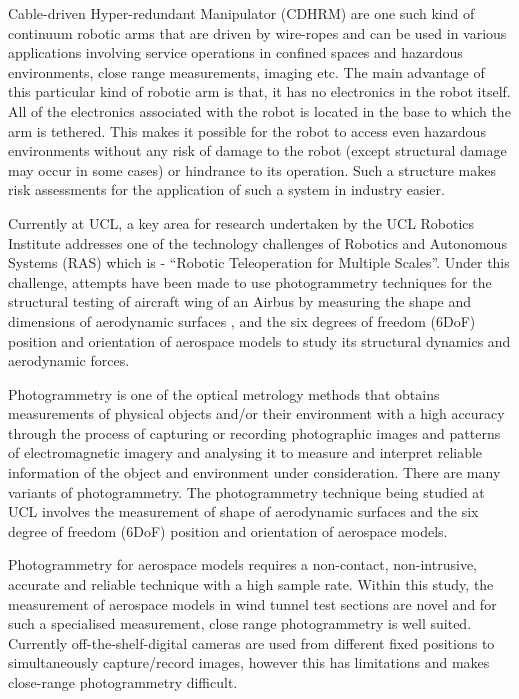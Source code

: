 \documentclass[a4paper,12pt]{report}
\begin{document}
Cable-driven Hyper-redundant Manipulator (CDHRM) are one such kind of continuum robotic arms that are driven by wire-ropes and can be used in various applications involving service operations in confined spaces and hazardous environments, close range measurements, imaging etc. The main advantage of this particular kind of robotic arm is that, it has no electronics in the robot itself. All of the electronics associated with the robot is located in the base to which the arm is tethered. This makes it possible for the robot to access even hazardous environments without any risk of damage to the robot (except structural damage may occur in some cases) or hindrance to its operation. Such a structure makes risk assessments for the application of such a system in industry easier. 

Currently at UCL, a key area for research undertaken by the UCL Robotics Institute addresses one of the technology challenges of Robotics and Autonomous Systems (RAS) which is - “Robotic Teleoperation for Multiple Scales”. Under this challenge, attempts have been made to use photogrammetry techniques for the structural testing of aircraft wing of an Airbus by measuring the shape and dimensions of aerodynamic surfaces \cite{shortis2016photogrammetric}, and the six degrees of freedom (6DoF) position and orientation of aerospace models to study its structural dynamics and aerodynamic forces.

Photogrammetry is one of the optical metrology methods that obtains measurements of physical objects and/or their environment with a high accuracy through the process of capturing or recording photographic images and patterns of electromagnetic imagery and analysing it to measure and interpret reliable information of the object and environment under consideration. There are many variants of photogrammetry. The photogrammetry technique being studied at UCL involves the measurement of shape of aerodynamic surfaces and the six degree of freedom (6DoF) position and orientation of aerospace models.

Photogrammetry for aerospace models requires a non-contact, non-intrusive, accurate and reliable technique with a high sample rate. Within this study, the measurement of aerospace models in wind tunnel test sections are novel and for such a specialised measurement, close range photogrammetry is well suited. Currently off-the-shelf-digital cameras are used from different fixed positions to simultaneously capture/record images, however this has limitations and makes close-range photogrammetry difficult.
\end{document}

